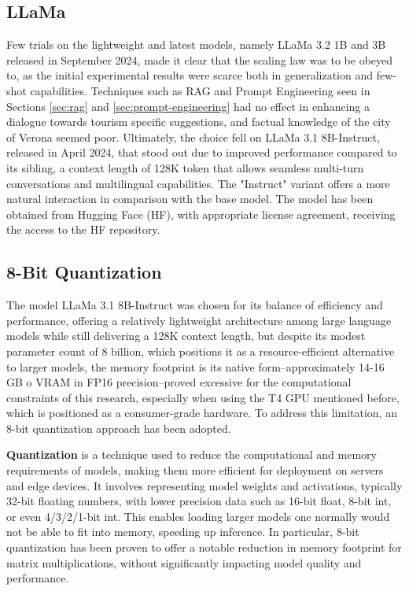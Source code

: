 \subsection{LLaMa}
\label{sec:llama}

Few trials on the lightweight and latest models, namely LLaMa 3.2 1B and 3B released in September 2024, made it clear that the scaling law was to be obeyed to, as the initial experimental results were scarce both in generalization and few-shot capabilities. Techniques such as RAG and Prompt Engineering seen in Sections \ref{sec:rag} and \ref{sec:prompt-engineering} had no effect in enhancing a dialogue towards tourism specific suggestions, and factual knowledge of the city of Verona seemed poor. Ultimately, the choice fell on LLaMa 3.1 8B-Instruct, released in April 2024, that stood out due to improved performance compared to its sibling, a context length of 128K token that allows seamless multi-turn conversations and multilingual capabilities. The "Instruct" variant offers a more natural interaction in comparison with the base model. The model has been obtained from Hugging Face (HF), with appropriate license agreement, receiving the access to the HF repository.


\subsection{8-Bit Quantization}
\label{sec:quantization}

The model LLaMa 3.1 8B-Instruct was chosen for its balance of efficiency and performance, offering a relatively lightweight architecture among large language models while still delivering a 128K context length, but despite its modest parameter count of 8 billion, which positions it as a resource-efficient alternative to larger models, the memory footprint is its native form--approximately 14-16 GB o VRAM in FP16 precision--proved excessive for the computational constraints of this research, especially when using the T4 GPU mentioned before, which is positioned as a consumer-grade hardware. To address this limitation, an 8-bit quantization approach has been adopted.

\textbf{Quantization} is a technique used to reduce the computational and memory requirements of models, making them more efficient for deployment on servers and edge devices. It involves representing model weights and activations, typically 32-bit floating numbers, with lower precision data such as 16-bit float, 8-bit int, or even 4/3/2/1-bit int. This enables loading larger models one normally would not be able to fit into memory, speeding up inference. \cite{dettmers2022int8} In particular, 8-bit quantization has been proven to offer a notable reduction in memory footprint for matrix multiplications, without significantly impacting model quality and performance.

